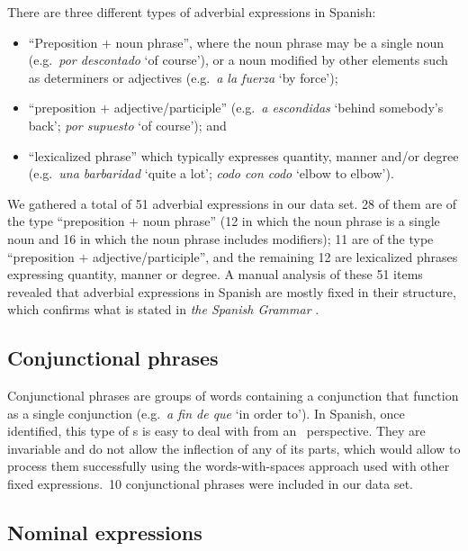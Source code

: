 \documentclass[output=paper]{langsci/langscibook}
\begin{document}
There are three different types of adverbial expressions in Spanish: 

\begin{itemize}
\item ``Preposition $+$ noun phrase'', where the noun phrase may be a single noun (e.g.\ \textit{por descontado} `of course'), or a noun modified by other elements such as determiners or adjectives (e.g.\ \textit{a la fuerza} `by force');
\item ``preposition $+$ adjective/participle'' (e.g.\ \textit{a escondidas} `behind somebody’s back'; \textit{por supuesto} `of course'); and
\item ``lexicalized phrase'' which typically expresses quantity, manner and/or degree (e.g.\ \textit{una barbaridad} `quite a lot'; \textit{codo con codo} `elbow to elbow').
\end{itemize}
 
We gathered a total of 51 adverbial expressions in our data set. 
28 of them are of the type ``preposition $+$ noun phrase'' (12 in which the noun phrase is a single noun and 16 in which the noun phrase includes modifiers); 11 are of the type ``preposition $+$ adjective/participle'', and the remaining 12 are lexicalized phrases expressing quantity, manner or degree.
A manual analysis of these 51 items revealed that adverbial expressions in Spanish are mostly fixed in their structure, which confirms what is stated in \textit{the Spanish Grammar} \citeyearpar[601]{RAE:2010}.

\subsection{Conjunctional phrases}
\label{sssec:conjunctionalPhrases}

Conjunctional phrases are groups of words containing a conjunction that function as a single conjunction (e.g.\ \textit{a fin de que} `in order to').
In Spanish, once identified, this type of \mwe s is easy to deal with from an \nlp\ perspective.
They are invariable and do not allow the inflection of any of its parts, which would allow to process them successfully using the words-with-spaces approach used with other fixed expressions.\ 10 conjunctional phrases were included in our data set.


\subsection{Nominal expressions}
\label{sssec:nominalExpressions}
\end{document}
